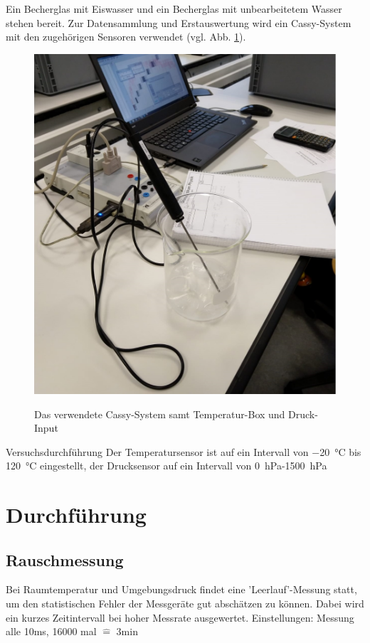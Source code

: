 \documentclass[]{article}
\begin{document}
Ein Becherglas mit Eiswasser und ein Becherglas mit unbearbeitetem Wasser stehen bereit. Zur Datensammlung und Erstauswertung wird ein Cassy-System mit den zugehörigen Sensoren verwendet (vgl. Abb. \ref{Cassy}).
\begin{figure}
	\begin{center}
		\includegraphics[scale=0.33]{Images/Cassy.jpg}
		\label{Cassy}
		\caption{Das verwendete Cassy-System samt Temperatur-Box und Druck-Input}
	\end{center}
\end{figure}
Versuchsdurchführung
Der Temperatursensor ist auf ein Intervall von \SI{-20}{\celsius} bis \SI{120}{\celsius} eingestellt, der Drucksensor auf ein Intervall von \SI{0}{\hecto\pascal}-\SI{1500}{\hecto\pascal}

\section{Durchführung}
\subsection{Rauschmessung}
Bei Raumtemperatur und Umgebungsdruck findet eine 'Leerlauf'-Messung statt, um den statistischen Fehler der Messgeräte gut abschätzen zu können. Dabei wird ein kurzes Zeitintervall bei hoher Messrate ausgewertet. 
Einstellungen: Messung alle 10ms, 16000 mal $\widehat{=}$ 3min
\end{document}
